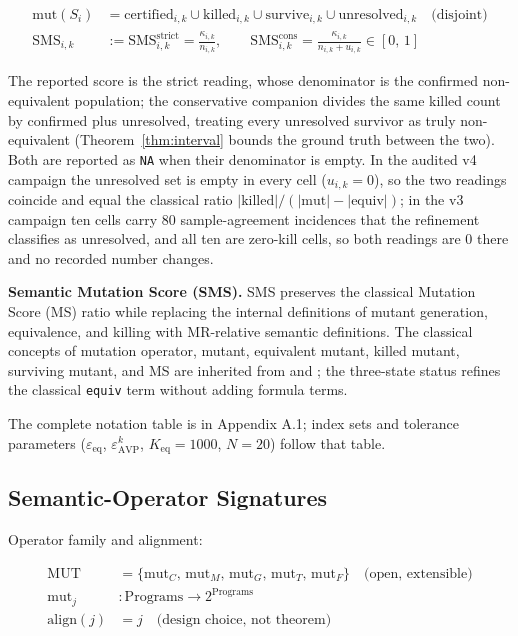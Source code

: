 \documentclass[review,12pt,authoryear]{elsarticle}
\begin{document}
\begin{align*}
\mathrm{mut}(S_i) &= \mathrm{certified}_{i,k} \cup \mathrm{killed}_{i,k} \cup \mathrm{survive}_{i,k} \cup \mathrm{unresolved}_{i,k} \quad \text{(disjoint)} \\
\mathrm{SMS}_{i,k} &:= \mathrm{SMS}^{\mathrm{strict}}_{i,k} = \frac{\kappa_{i,k}}{n_{i,k}}, \qquad
\mathrm{SMS}^{\mathrm{cons}}_{i,k} = \frac{\kappa_{i,k}}{n_{i,k} + u_{i,k}} \in [0,\,1]
\end{align*}

The reported score is the strict reading, whose denominator is the
confirmed non-equivalent population; the conservative companion divides
the same killed count by confirmed plus unresolved, treating every
unresolved survivor as truly non-equivalent
(Theorem~\ref{thm:interval} bounds the ground truth between the two).
Both are reported as \texttt{NA} when their denominator is empty. In the
audited v4 campaign the unresolved set is empty in every cell
($u_{i,k} = 0$), so the two readings coincide and equal the classical
ratio $|\mathrm{killed}|/(|\mathrm{mut}| - |\mathrm{equiv}|)$; in the v3
campaign ten cells carry 80 sample-agreement incidences that the
refinement classifies as unresolved, and all ten are zero-kill cells, so
both readings are $0$ there and no recorded number changes.

\textbf{Semantic Mutation Score (SMS).} SMS preserves the classical
Mutation Score (MS) ratio while replacing the internal definitions of
mutant generation, equivalence, and killing with MR-relative semantic
definitions. The classical concepts of mutation operator, mutant,
equivalent mutant, killed mutant, surviving mutant, and MS are inherited
from \citet{d7c38286734419b52de4262c9802ebdfcf4b9447} and
\citet{ammann2008introduction}; the three-state status refines the
classical \texttt{equiv} term without adding formula terms.

The complete notation table is in Appendix A.1; index sets and tolerance
parameters ($\varepsilon_{\mathrm{eq}}$, $\varepsilon_{\mathrm{AVP}}^k$,
$K_{\mathrm{eq}} = 1000$, $N = 20$) follow that table.

\subsection{Semantic-Operator Signatures}\label{operator-signatures}

Operator family and alignment:

\begin{align*}
\mathrm{MUT} &= \{\mathrm{mut}_C,\, \mathrm{mut}_M,\, \mathrm{mut}_G,\, \mathrm{mut}_T,\, \mathrm{mut}_F\} \quad \text{(open, extensible)} \\
\mathrm{mut}_j &: \text{Programs} \to 2^{\text{Programs}} \\
\mathrm{align}(j) &= j \quad \text{(design choice, not theorem)}
\end{align*}
\end{document}
